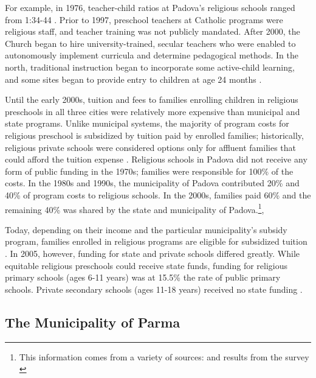 For example, in 1976, teacher-child ratios at Padova's religious schools ranged from 1:34-44 \citep{Padova-Admin-Data_1964-2011}. Prior to 1997, preschool teachers at Catholic programs were religious staff, and teacher training was not publicly mandated. After 2000, the Church began to hire university-trained, secular teachers who were enabled to autonomously implement curricula and determine pedagogical methods. In the north, traditional instruction began to incorporate some active-child learning, and some sites began to provide entry to children at age 24 months \citep{Hohnerlein_2009_Paradox-Public-Preschools,CEHD_2016_Historical-Analysis}. 

Until the early 2000s, tuition and fees to families enrolling children in religious preschools in all three cities were relatively more expensive than municipal and state programs. Unlike municipal systems, the majority of program costs for religious preschool is subsidized by tuition paid by enrolled families; historically, religious private schools were considered options only for affluent families that could afford the tuition expense \citep{Hohnerlein_2009_Paradox-Public-Preschools}. Religious schools in Padova did not receive any form of public funding in the 1970s; families were responsible for 100\% of the costs. In the 1980s and 1990s, the municipality of Padova contributed 20\% and 40\% of program costs to religious schools. In the 2000s, families paid 60\% and the remaining 40\% was shared by the state and municipality of Padova.\footnote{This information comes from a variety of sources: \citet{Reggio-Admin-data_1966-2006, Reggio-Annual-Journals_1994-2011, Padova-Admin-Data_1964-2011} and results from the survey \citep{CEHD_2016_Historical-Analysis}},

Today, depending on their income and the particular municipality's subsidy program, families enrolled in religious programs are eligible for subsidized tuition \citep{Hohnerlein_2009_Paradox-Public-Preschools}. In 2005, however, funding for state and private schools differed greatly. While equitable religious preschools could receive state funds, funding for religious primary schools (ages 6-11 years) was at 15.5\% the rate of public primary schools. Private secondary schools (ages 11-18 years) received no state funding \citep{Becchi-Ferrari_1990_Pub-Inf-Centres-Italy}.

\subsection{The Municipality of Parma}

